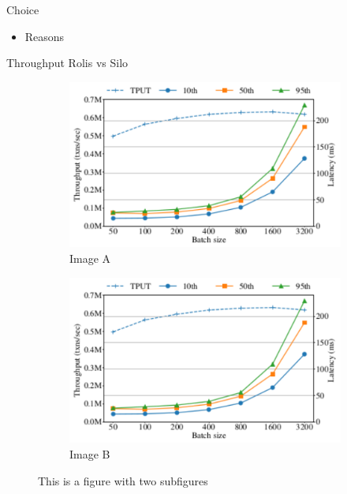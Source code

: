 \documentclass[notes, xcolor=dvipsnames]{beamer}
\begin{document}
    \begin{frame}{Choice}

        \begin{itemize}
            \item Reasons
        \end{itemize}

    \end{frame}

    \begin{frame}{Throughput Rolis vs Silo}
        
        \begin{figure}
            \begin{subfigure}[h]{0.4\textwidth}
                \includegraphics[scale=0.35]{RolisBatch1.pdf}
                \caption{Image A}
            \end{subfigure}
            \hfill
                \begin{subfigure}[h]{0.4\textwidth}
                \includegraphics[scale=0.35]{RolisBatch1.pdf}
                \caption{Image B}
            \end{subfigure}%
            \caption{This is a figure with two subfigures}
        \end{figure}

    \end{frame}
\end{document}
